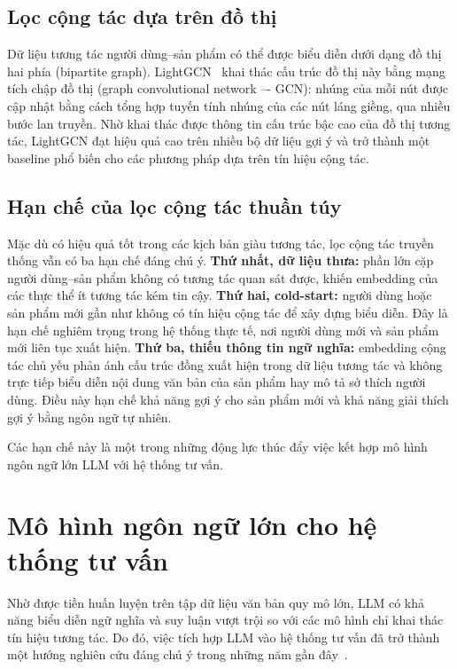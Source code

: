 \subsection{Lọc cộng tác dựa trên đồ thị}
\label{ssec:lightgcn}

Dữ liệu tương tác người dùng--sản phẩm có thể được biểu diễn dưới dạng đồ thị hai phía (bipartite graph).
LightGCN~\cite{lightgcn2020} khai thác cấu trúc đồ thị này bằng mạng tích chập đồ thị (graph convolutional network –- GCN):
nhúng của mỗi nút được cập nhật bằng cách tổng hợp tuyến tính nhúng
của các nút láng giềng, qua nhiều bước lan truyền. Nhờ khai thác được thông
tin cấu trúc bậc cao của đồ thị tương tác, LightGCN đạt hiệu quả cao trên nhiều bộ dữ liệu gợi ý và trở thành một baseline
phổ biến cho các phương pháp dựa trên tín hiệu cộng tác.

\subsection{Hạn chế của lọc cộng tác thuần túy}
\label{ssec:han-che-cf}

Mặc dù có hiệu quả tốt trong các kịch bản giàu tương tác, lọc cộng tác truyền thống vẫn có ba
hạn chế đáng chú ý. \textbf{Thứ nhất, dữ liệu thưa:} phần lớn cặp người dùng--sản phẩm không
có tương tác quan sát được, khiến embedding của các thực thể ít tương tác kém tin cậy.
\textbf{Thứ hai, cold-start:} người dùng hoặc sản phẩm mới gần như không có tín hiệu cộng tác
để xây dựng biểu diễn. Đây là hạn chế nghiêm trọng trong hệ thống thực tế,
nơi người dùng mới và sản phẩm mới liên tục xuất hiện. \textbf{Thứ ba, thiếu thông tin ngữ nghĩa:}
embedding cộng tác chủ yếu phản ánh cấu trúc đồng xuất hiện trong dữ liệu tương tác và không trực tiếp
biểu diễn nội dung văn bản của sản phẩm hay mô tả sở thích người dùng. Điều này hạn chế khả năng gợi ý
cho sản phẩm mới và khả năng giải thích gợi ý bằng ngôn ngữ tự nhiên.

Các hạn chế này là một trong những động lực thúc đẩy việc kết hợp mô hình ngôn ngữ lớn LLM với hệ
thống tư vấn.

\section{Mô hình ngôn ngữ lớn cho hệ thống tư vấn}
\label{sec:llm-rec}

Nhờ được tiền huấn luyện trên tập dữ liệu văn bản quy mô lớn, LLM có khả năng biểu diễn
ngữ nghĩa và suy luận vượt trội so với các mô hình chỉ khai thác tín hiệu tương tác. Do đó,
việc tích hợp LLM vào hệ thống tư vấn đã trở thành một hướng nghiên cứu đáng chú ý trong
những năm gần đây~\cite{llmrec2023}.

